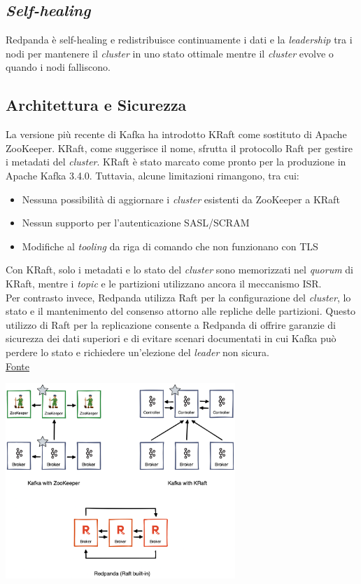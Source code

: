 \subsection{\textit{Self-healing}}
Redpanda è self-healing e redistribuisce continuamente i dati e la \textit{leadership} tra i nodi per mantenere il \textit{cluster} in uno stato ottimale mentre il \textit{cluster} evolve o quando i nodi falliscono.

\subsection{Architettura e Sicurezza}
La versione più recente di Kafka ha introdotto KRaft come sostituto di Apache ZooKeeper. KRaft, come suggerisce il nome, sfrutta il protocollo Raft per gestire i metadati del \textit{cluster}.
KRaft è stato marcato come pronto per la produzione in Apache Kafka 3.4.0. Tuttavia, alcune limitazioni rimangono, tra cui:

\begin{itemize}
	\item Nessuna possibilità di aggiornare i \textit{cluster} esistenti da ZooKeeper a KRaft
	\item Nessun supporto per l'autenticazione SASL/SCRAM
	\item Modifiche al \textit{tooling} da riga di comando che non funzionano con TLS
\end{itemize}
Con KRaft, solo i metadati e lo stato del \textit{cluster} sono memorizzati nel \textit{quorum} di KRaft, mentre i \textit{topic} e le partizioni utilizzano ancora il meccanismo ISR.\\
Per contrasto invece, Redpanda utilizza Raft per la configurazione del \textit{cluster}, lo stato e il mantenimento del consenso attorno alle repliche delle partizioni. Questo utilizzo di Raft per la replicazione consente a Redpanda di offrire garanzie di sicurezza dei dati superiori e di evitare scenari documentati in cui Kafka può perdere lo stato e richiedere un'elezione del \textit{leader} non
sicura.
\\
\href{https://redpanda.com/blog/kafka-kraft-vs-redpanda-performance-2023}{Fonte}


\begin{center}
	\includegraphics[width=0.65\textwidth]{imgs/kafka_zookeeper.png}
\end{center}


